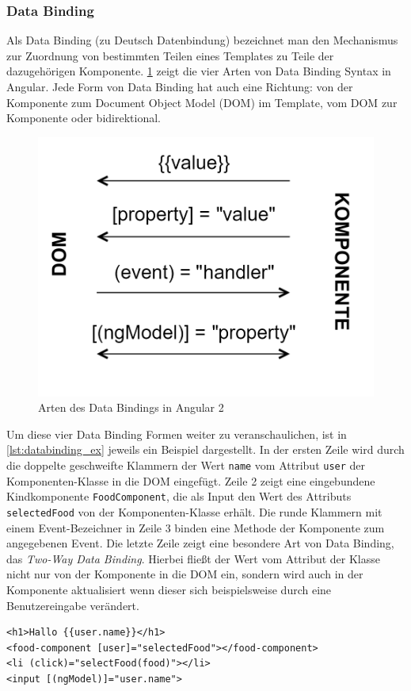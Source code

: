 \subsubsection{Data Binding}
Als Data Binding (zu Deutsch Datenbindung) bezeichnet man den Mechanismus zur Zuordnung von bestimmten Teilen eines Templates zu Teile der dazugehörigen Komponente. \cref{fig:databinding} zeigt die vier Arten von Data Binding Syntax in Angular. Jede Form von Data Binding hat auch eine Richtung: von der Komponente zum Document Object Model (\acs{DOM}) im Template, vom \acs{DOM} zur Komponente oder bidirektional.

\begin{figure}[ht!]
	\centering
	\includegraphics[width=0.5\linewidth]{bilder/kap5/databinding}
	\caption[Arten des Data Bindings in Angular 2]{Arten des Data Bindings in Angular 2}
	\label{fig:databinding}
\end{figure}

\newpage
Um diese vier Data Binding Formen weiter zu veranschaulichen, ist in \cref{lst:databinding_ex} jeweils ein Beispiel dargestellt. In der ersten Zeile wird durch die doppelte geschweifte Klammern der Wert \texttt{name} vom Attribut \texttt{user} der Komponenten-Klasse in die \acs{DOM} eingefügt. Zeile 2 zeigt eine eingebundene Kindkomponente \texttt{FoodComponent}, die als Input den Wert des Attributs \texttt{selectedFood} von der Komponenten-Klasse erhält. Die runde Klammern mit einem Event-Bezeichner in Zeile 3 binden eine Methode der Komponente zum angegebenen Event. Die letzte Zeile zeigt eine besondere Art von Data Binding, das \textit{Two-Way Data Binding}. Hierbei fließt der Wert vom Attribut der Klasse nicht nur von der Komponente in die \acs{DOM} ein, sondern wird auch in der Komponente aktualisiert wenn dieser sich beispielsweise durch eine Benutzereingabe verändert.
\\
\begin{lstlisting}[language=HTML5,caption={Beispiele zu den Data Binding Arten},label=lst:databinding_ex]
<h1>Hallo {{user.name}}</h1>
<food-component [user]="selectedFood"></food-component>
<li (click)="selectFood(food)"></li>
<input [(ngModel)]="user.name">
\end{lstlisting}


